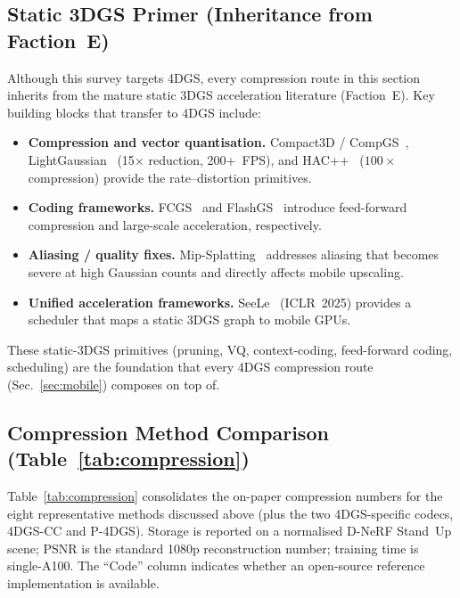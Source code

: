 \subsection{Static 3DGS Primer (Inheritance from Faction~E)}
Although this survey targets 4DGS, every compression route in this
section inherits from the mature static 3DGS acceleration literature
(Faction~E). Key building blocks that transfer to 4DGS include:
\begin{itemize}
  \item \textbf{Compression and vector quantisation.}
        Compact3D / CompGS~\cite{navaneet2023compact3d},
        LightGaussian~\cite{fan2023lightgaussian} (15$\times$
        reduction, 200+~FPS), and HAC++~\cite{chen2024hacpp}
        ($100\times$ compression) provide the rate--distortion
        primitives.
  \item \textbf{Coding frameworks.}
        FCGS~\cite{chen2024fcgs} and
        FlashGS~\cite{feng2024flashgs} introduce feed-forward
        compression and large-scale acceleration, respectively.
  \item \textbf{Aliasing / quality fixes.}
        Mip-Splatting~\cite{yu2024mipsplatting} addresses
        aliasing that becomes severe at high Gaussian counts and
        directly affects mobile upscaling.
  \item \textbf{Unified acceleration frameworks.}
        SeeLe~\cite{huang2025seele} (ICLR~2025) provides a
        scheduler that maps a static 3DGS graph to mobile
        GPUs.
\end{itemize}
These static-3DGS primitives (pruning, VQ, context-coding,
feed-forward coding, scheduling) are the foundation that every
4DGS compression route (Sec.~\ref{sec:mobile}) composes on top of.

\subsection{Compression Method Comparison (Table~\ref{tab:compression})}
Table~\ref{tab:compression} consolidates the on-paper compression
numbers for the eight representative methods discussed above (plus
the two 4DGS-specific codecs, 4DGS-CC and P-4DGS). Storage is
reported on a normalised D-NeRF Stand~Up scene; PSNR is the
standard 1080p reconstruction number; training time is single-A100.
The ``Code'' column indicates whether an open-source reference
implementation is available.


